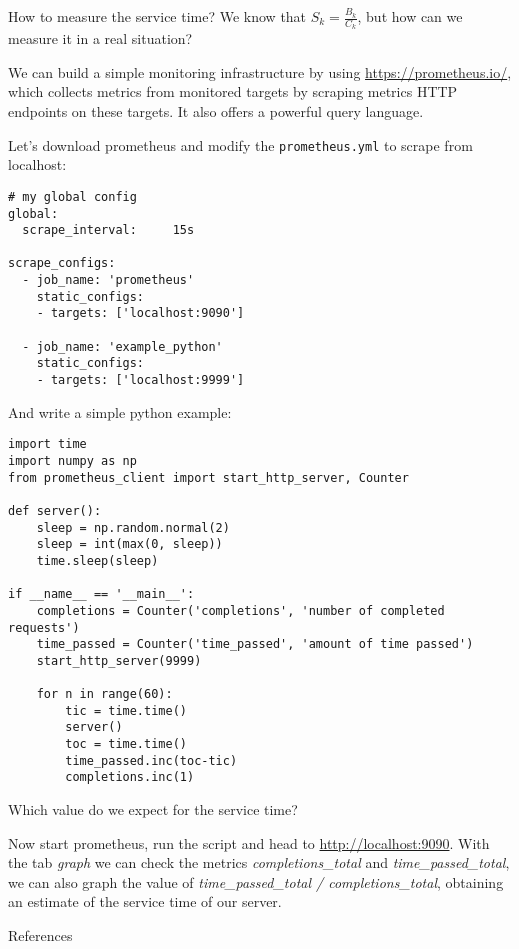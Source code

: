\documentclass[]{beamer}
\begin{document}
\begin{frame}{How to measure the service time?}
We know that $S_k = \frac{B_k}{C_k}$, but how can we measure it in a real situation?

We can build a simple monitoring infrastructure by using \url{https://prometheus.io/}, which collects metrics from monitored targets by scraping metrics HTTP endpoints on these targets.
It also offers a powerful query language.

\framebreak

Let's download prometheus and modify the \texttt{prometheus.yml} to scrape from localhost:
\begin{lstlisting}[basicstyle=\small]
# my global config
global:
  scrape_interval:     15s 

scrape_configs:
  - job_name: 'prometheus'
    static_configs:
    - targets: ['localhost:9090']

  - job_name: 'example_python'
    static_configs:
    - targets: ['localhost:9999']
\end{lstlisting}

\framebreak

And write a simple python example:
\begin{lstlisting}[basicstyle=\tiny]
import time
import numpy as np
from prometheus_client import start_http_server, Counter

def server():
    sleep = np.random.normal(2)
    sleep = int(max(0, sleep))
    time.sleep(sleep)

if __name__ == '__main__':
    completions = Counter('completions', 'number of completed requests')
    time_passed = Counter('time_passed', 'amount of time passed')
    start_http_server(9999)
    
    for n in range(60):
        tic = time.time()
        server()
        toc = time.time()
        time_passed.inc(toc-tic)
        completions.inc(1)
\end{lstlisting}

\framebreak

Which value do we expect for the service time?

Now start prometheus, run the script and head to \url{http://localhost:9090}.
With the tab \emph{graph} we can check the metrics \emph{completions\_total} and \emph{time\_passed\_total},
we can also graph the value of \emph{time\_passed\_total /  completions\_total}, obtaining an estimate of the service time of our server.

\end{frame}

\begin{frame}{References}
\printbibliography
\end{frame}
\end{document}
